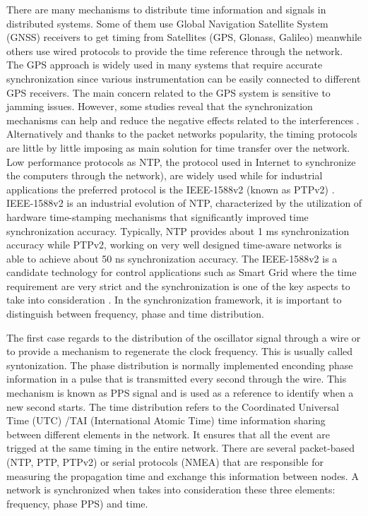 There are many mechanisms to distribute time information and signals in distributed systems. Some of them use Global Navigation Satellite System (GNSS) receivers to get timing from Satellites (GPS, Glonass, Galileo) meanwhile others use wired protocols to provide the time reference 
through the network. The GPS approach is widely used in many systems that require accurate synchronization since various instrumentation can be easily connected to different GPS receivers. The main concern related to the GPS system is sensitive to jamming issues. However, some studies reveal that the synchronization mechanisms can help and reduce the negative effects related to the interferences \cite{NOURA2016130}. Alternatively and thanks to the packet networks popularity, the timing protocols are little by little imposing as main solution for time transfer over the network. Low performance protocols as NTP, the protocol used in Internet to synchronize the computers through the network), \cite{ntf:ntp_std} are widely used while for industrial applications the preferred protocol is the IEEE-1588v2 (known as PTPv2) \cite{ieee:ieee1588_std} \cite{itu:TG8275_1_Y_1369_1}. IEEE-1588v2 is an industrial evolution of NTP, characterized by the utilization of hardware time-stamping mechanisms that significantly improved time synchronization accuracy. Typically, NTP provides about 1 ms synchronization accuracy while PTPv2, working on very well designed time-aware networks is able to achieve about 50 ns synchronization accuracy. The IEEE-1588v2 is a candidate technology for control applications such as Smart Grid \cite{NAFI201623} where the time requirement are very strict and the synchronization is one of the key aspects to take into consideration \cite{COLAK2016396}.
In the synchronization framework, it is important to distinguish between frequency, phase and time distribution.

The first case regards to the distribution of the oscillator signal through a wire or to provide a mechanism to regenerate the clock frequency. This is usually  called syntonization. 
The phase distribution is normally implemented enconding phase information in a pulse that is transmitted every second through the wire. This mechanism is known as PPS signal and is used as a reference to identify when a new second starts.
The time distribution refers to the Coordinated Universal Time (UTC) /TAI (International Atomic Time) time information sharing between different elements in the network. It ensures that all the event are trigged at the same timing in the entire network. There are several packet-based (NTP, PTP, PTPv2) or serial protocols (NMEA) that are responsible for measuring the propagation time and exchange this information between nodes. 
A network is synchronized when takes into consideration these three elements: frequency, phase PPS) and time.

